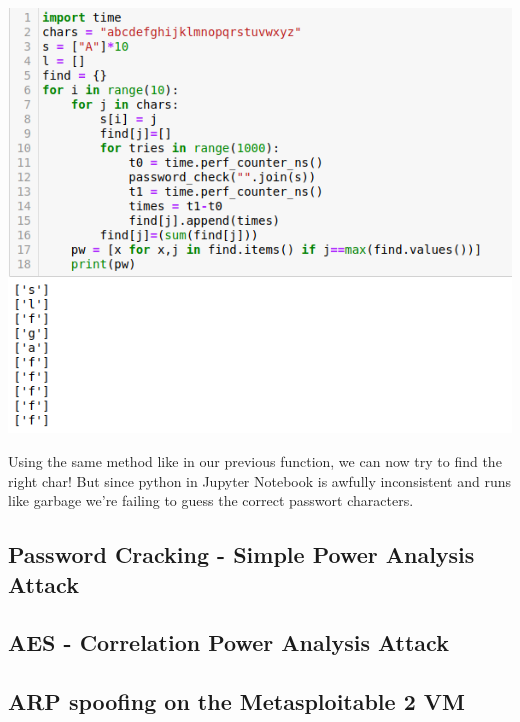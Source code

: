 \documentclass[a4paper,10pt]{article}
\begin{document}
\begin{center}
 \includegraphics[scale=0.5]{pw.png}
\end{center}
Using the same method like in our previous function, we can now try to find the right char! But since python in Jupyter Notebook is awfully inconsistent and runs like garbage we're failing to guess the correct passwort characters.
\subsection{Password Cracking - Simple Power Analysis Attack}
\subsection{AES - Correlation Power Analysis Attack}
\newpage
\subsection{ARP spoofing on the Metasploitable 2 VM}
\end{document}
